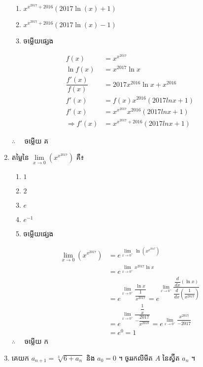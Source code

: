 \documentclass[a4paper,12pt]{article}
\begin{document}
\begin{enumerate}[m]
\begin{enumerate}[k,2]
			\item $x^{x^{2017}+2016}\left(2017\ln\left(x\right)+1\right)$
			\item $x^{x^{2017}+2016}\left(2017\ln\left(x\right)-1\right)$
			\item ចម្លើយផ្សេង
		\end{enumerate}
	\answer
		\begin{align*}
			f(x)&=x^{x^{2017}}\\
			\ln f(x)&=x^{2017}\ln x\\
			\dfrac{f'(x)}{f(x)}&=2017x^{2016}\ln x +x^{2016}\\
			f'(x)&=f(x)x^{2016}\left(2017ln x+1\right)\\
			f'(x)&=x^{x^{2017}}x^{2016}\left(2017ln x+1\right)\\
			\Rightarrow f'(x)&=x^{x^{2017}+2016}\left(2017ln x+1\right)
		\end{align*}
		\begin{center}
			$\therefore \quad$ \kml ចម្លើយ \kbk គ
		\end{center}
	{\color{blue}\hrulefill}
	\item តម្លៃនៃ $\lim\limits_{x\to0}\left(x^{x^{2017}}\right)$ គឺ៖
	\begin{enumerate}[k,5]
		\item $1$
		\item $2$
		\item $e$
		\item $e^{-1}$
		\item ចម្លើយផ្សេង
	\end{enumerate}
	\answer
	\begin{center}
		\begin{align*}
			\lim\limits_{x\to0}\left(x^{x^{2017}}\right)&=e^{\lim\limits_{x\to0^+}\ln\left(x^{x^{2017}}\right)}\\
			&=e^{\lim\limits_{x\to0^+}x^{2017}\ln x}\\
			&=e^{\lim\limits_{x\to0^+}\dfrac{\ln x}{\dfrac{1}{x^{2017}}}}=e^{\lim\limits_{x\to0^+}\dfrac{\dfrac{d}{dx}\left(\ln x\right)}{\dfrac{d}{dx}\left(\dfrac{1}{x^{2017}}\right)}}\\
			&=e^{\lim\limits_{x\to0^+}\dfrac{\dfrac{1}{x}}{-\dfrac{2017}{x^{2018}}}}=e^{\lim\limits_{x\to0^+}\dfrac{x^{2017}}{-2017}}\\
			&=e^0=1
		\end{align*}
		$\therefore \quad$ \kml ចម្លើយ \kbk ក
	\end{center}
	{\color{blue}\hrulefill}
	\item គេយក $a_{n+1}=\sqrt[3]{6+a_n}$ និង $a_0=0$ ។ ចូររកលីមីត $A$ នៃស្វ៊ីត $a_n$ ។

\end{enumerate}
\end{document}
